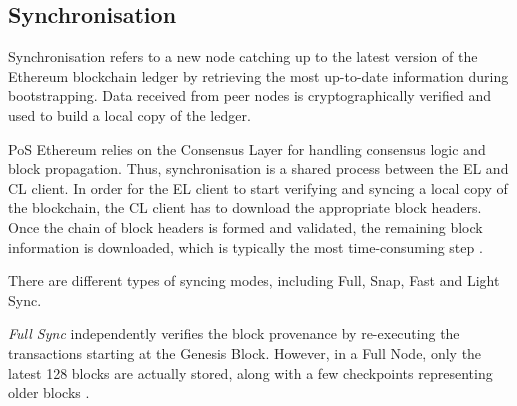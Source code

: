 






\subsection{Synchronisation} 
\label{SyncLitRev}

Synchronisation refers to a new node catching up to the latest version of the Ethereum blockchain ledger by retrieving the most up-to-date information during bootstrapping. Data received from peer nodes is cryptographically verified and used to build a local copy of the ledger.

PoS Ethereum relies on the Consensus Layer for handling consensus logic and block propagation. Thus, synchronisation is a shared process between the EL and CL client. In order for the EL client to start verifying and syncing a local copy of the blockchain, the CL client has to download the appropriate block headers. Once the chain of block headers is formed and validated, the remaining block information is downloaded, which is typically the most time-consuming step \cite{2022DeveloperGo-ethereum}.

There are different types of syncing modes, including Full, Snap, Fast and Light Sync.

\textit{Full Sync }independently verifies the block provenance by re-executing the transactions starting at the Genesis Block. However, in a Full Node, only the latest 128 blocks are actually stored, along with a few checkpoints representing older blocks \cite{EthereumEthereum.org}. 

